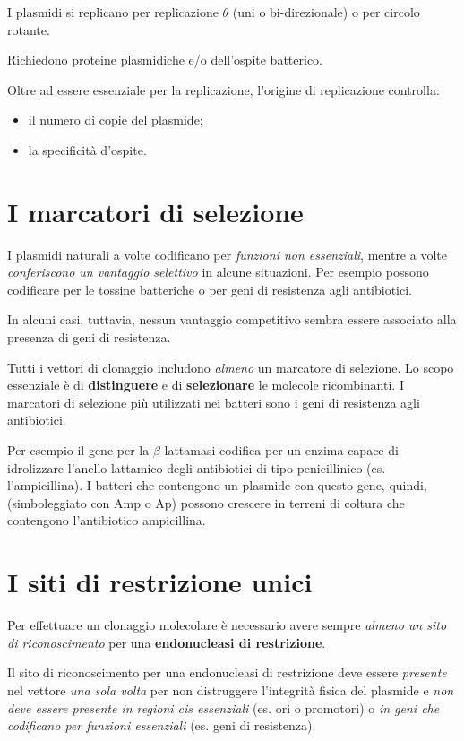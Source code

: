 \documentclass[11pt]{book}
\begin{document}
I plasmidi si replicano per replicazione \(\theta\) (uni o
bi-direzionale) o per circolo rotante.

Richiedono proteine plasmidiche e/o dell'ospite batterico.

Oltre ad essere essenziale per la replicazione, l'origine di
replicazione controlla:

\begin{itemize}
\itemsep1pt\parskip0pt
\item
  il numero di copie del plasmide;
\item
  la specificità d'ospite.
\end{itemize}

\section{I marcatori di selezione}\label{i-marcatori-di-selezione}

I plasmidi naturali a volte codificano per \emph{funzioni non
essenziali}, mentre a volte \emph{conferiscono un vantaggio selettivo}
in alcune situazioni. Per esempio possono codificare per le tossine
batteriche o per geni di resistenza agli antibiotici.

In alcuni casi, tuttavia, nessun vantaggio competitivo sembra essere
associato alla presenza di geni di resistenza.

Tutti i vettori di clonaggio includono \emph{almeno} un marcatore di
selezione. Lo scopo essenziale è di \textbf{distinguere} e di
\textbf{selezionare} le molecole ricombinanti. I marcatori di selezione
più utilizzati nei batteri sono i geni di resistenza agli antibiotici.

Per esempio il gene per la \(\beta\)-lattamasi codifica per un enzima
capace di idrolizzare l'anello lattamico degli antibiotici di tipo
penicillinico (es. l'ampicillina). I batteri che contengono un plasmide
con questo gene, quindi,(simboleggiato con Amp o Ap) possono crescere in
terreni di coltura che contengono l'antibiotico ampicillina.

\section{I siti di restrizione
unici}\label{i-siti-di-restrizione-unici}

Per effettuare un clonaggio molecolare è necessario avere sempre
\emph{almeno un sito di riconoscimento} per una \textbf{endonucleasi di
restrizione}.

Il sito di riconoscimento per una endonucleasi di restrizione deve
essere \emph{presente} nel vettore \emph{una sola volta} per non
distruggere l'integrità fisica del plasmide e \emph{non deve essere
presente in regioni cis essenziali} (es. ori o promotori) o \emph{in
geni che codificano per funzioni essenziali} (es. geni di resistenza).
\end{document}

